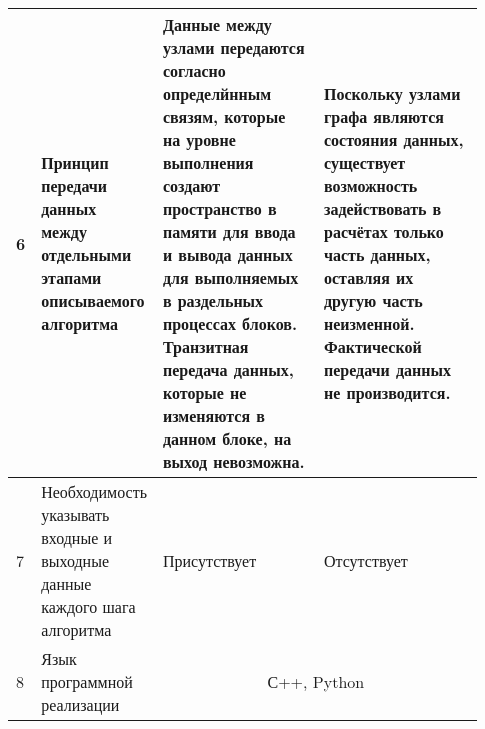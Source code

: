 \begin{landscape}
\begin{longtable}{|p{0.03\linewidth}|p{0.2\linewidth}|p{0.35\linewidth}|p{0.35\linewidth}|}
        6          & Принцип передачи данных между отдельными этапами описываемого алгоритма                    & Данные между узлами передаются согласно определйнным связям, которые на уровне выполнения создают пространство в памяти для ввода и вывода данных для выполняемых в раздельных процессах блоков. Транзитная передача данных, которые не изменяются в данном блоке, на выход невозможна.                                                                                                                                                                                                                                                                                                                                                                           & Поскольку узлами графа являются состояния данных, существует возможность задействовать в расчётах только часть данных, оставляя их другую часть неизменной. Фактической передачи данных не производится.                                                                          \\
        \hline
        7          & Необходимость указывать входные и выходные данные каждого шага алгоритма                   & Присутствует                                                                                                                                                                                                                                                                                                                                                                                                                                                                                                                                                                                                                                                      & Отсутствует                                                                                                                                                                                                                                                                       \\
        \hline
        8          & Язык программной реализации                                                                & \multicolumn{2}{c|}{С++, Python}                                                                                                                                                                                                                                                                                                                                                                                                                                                                                                                                                                                                                                                                                                                                                                                                                                                                                                                      \\

\end{longtable}
\end{landscape}
